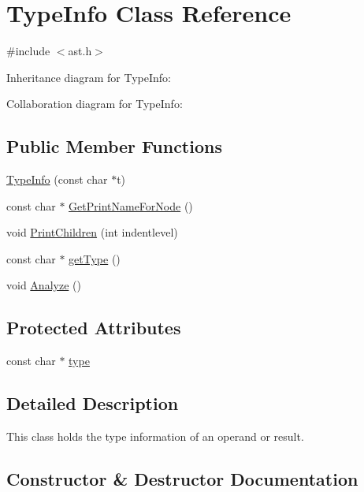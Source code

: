 \hypertarget{class_type_info}{}\section{Type\+Info Class Reference}
\label{class_type_info}


{\ttfamily \#include $<$ast.\+h$>$}



Inheritance diagram for Type\+Info\+:


Collaboration diagram for Type\+Info\+:
\subsection*{Public Member Functions}
\begin{DoxyCompactItemize}
\item 
\hyperlink{class_type_info_a77a1ebcef0494edd828e7912269204fe}{Type\+Info} (const char $\ast$t)
\item 
const char $\ast$ \hyperlink{class_type_info_a3e84b02093115e1ad0c27acbe3ffffd7}{Get\+Print\+Name\+For\+Node} ()
\item 
void \hyperlink{class_type_info_a9b4bc126eb0ee406f1d515e166256627}{Print\+Children} (int indentlevel)
\item 
const char $\ast$ \hyperlink{class_type_info_a53b947997bf124e64ab5a18d16388558}{get\+Type} ()
\item 
void \hyperlink{class_type_info_a157de3b92f5333b031650065591ac04f}{Analyze} ()
\end{DoxyCompactItemize}
\subsection*{Protected Attributes}
\begin{DoxyCompactItemize}
\item 
const char $\ast$ \hyperlink{class_type_info_a07af85dc9ce62676640cf960cac376a7}{type}
\end{DoxyCompactItemize}


\subsection{Detailed Description}
This class holds the type information of an operand or result. 

\subsection{Constructor \& Destructor Documentation}
\mbox{\label{class_type_info_a77a1ebcef0494edd828e7912269204fe}} 
